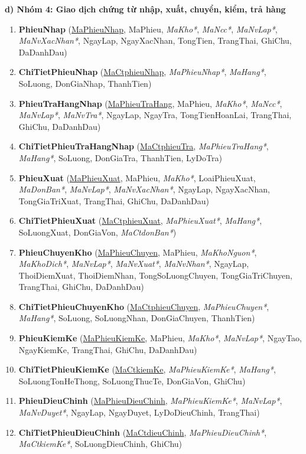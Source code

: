 \documentclass[12pt,a4paper]{report}
\renewcommand{\_}{\textunderscore\allowbreak}
\begin{document}
\begin{sloppypar}
\textbf{d) Nhóm 4: Giao dịch chứng từ nhập, xuất, chuyển, kiểm, trả hàng}
\begin{enumerate}[leftmargin=*, resume, label={\textbf{\arabic*./}}]
    \item \textbf{PhieuNhap} (\underline{MaPhieuNhap}, MaPhieu, \textit{MaKho*}, \textit{MaNcc*}, \textit{MaNvLap*}, \textit{MaNvXacNhan*}, NgayLap, NgayXacNhan, TongTien, TrangThai, GhiChu, DaDanhDau)
    \item \textbf{ChiTietPhieuNhap} (\underline{MaCtphieuNhap}, \textit{MaPhieuNhap*}, \textit{MaHang*}, SoLuong, DonGiaNhap, ThanhTien)
    \item \textbf{PhieuTraHangNhap} (\underline{MaPhieuTraHang}, MaPhieu, \textit{MaKho*}, \textit{MaNcc*}, \textit{MaNvLap*}, \textit{MaNvTra*}, NgayLap, NgayTra, TongTienHoanLai, TrangThai, GhiChu, DaDanhDau)
    \item \textbf{ChiTietPhieuTraHangNhap} (\underline{MaCtphieuTra}, \textit{MaPhieuTraHang*}, \textit{MaHang*}, SoLuong, DonGiaTra, ThanhTien, LyDoTra)
    \item \textbf{PhieuXuat} (\underline{MaPhieuXuat}, MaPhieu, \textit{MaKho*}, LoaiPhieuXuat, \textit{MaDonBan*}, \textit{MaNvLap*}, \textit{MaNvXacNhan*}, NgayLap, NgayXacNhan, TongGiaTriXuat, TrangThai, GhiChu, DaDanhDau)
    \item \textbf{ChiTietPhieuXuat} (\underline{MaCtphieuXuat}, \textit{MaPhieuXuat*}, \textit{MaHang*}, SoLuongXuat, DonGiaVon, \textit{MaCtdonBan*})
    \item \textbf{PhieuChuyenKho} (\underline{MaPhieuChuyen}, MaPhieu, \textit{MaKhoNguon*}, \textit{MaKhoDich*}, \textit{MaNvLap*}, \textit{MaNvXuat*}, \textit{MaNvNhan*}, NgayLap, ThoiDiemXuat, ThoiDiemNhan, TongSoLuongChuyen, TongGiaTriChuyen, TrangThai, GhiChu, DaDanhDau)
    \item \textbf{ChiTietPhieuChuyenKho} (\underline{MaCtphieuChuyen}, \textit{MaPhieuChuyen*}, \textit{MaHang*}, SoLuong, SoLuongNhan, DonGiaChuyen, ThanhTien)
    \item \textbf{PhieuKiemKe} (\underline{MaPhieuKiemKe}, MaPhieu, \textit{MaKho*}, \textit{MaNvLap*}, NgayTao, NgayKiemKe, TrangThai, GhiChu, DaDanhDau)
    \item \textbf{ChiTietPhieuKiemKe} (\underline{MaCtkiemKe}, \textit{MaPhieuKiemKe*}, \textit{MaHang*}, SoLuongTonHeThong, SoLuongThucTe, DonGiaVon, GhiChu)
    \item \textbf{PhieuDieuChinh} (\underline{MaPhieuDieuChinh}, \textit{MaPhieuKiemKe*}, \textit{MaNvLap*}, \textit{MaNvDuyet*}, NgayLap, NgayDuyet, LyDoDieuChinh, TrangThai)
    \item \textbf{ChiTietPhieuDieuChinh} (\underline{MaCtdieuChinh}, \textit{MaPhieuDieuChinh*}, \textit{MaCtkiemKe*}, SoLuongDieuChinh, GhiChu)
\end{enumerate}


\end{sloppypar}
\end{document}
